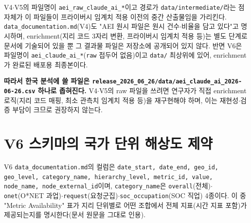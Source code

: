 \documentclass[11pt]{article}
\begin{document}
V4$\cdot$V5의 파일명이 \texttt{aei\_raw\_claude\_ai\_*}이고 경로가 \texttt{data/intermediate/}라는 점 자체가 이 파일들이 프라이버시 임계치 적용 이전의 중간 산출물임을 가리킨다. \texttt{data\_documentation.md}(V4)도 "AEI 원시 파일은 원시 건수$\cdot$비율을 담고 있다"고 명시하며, enrichment(지리 코드 3자리 변환, 프라이버시 임계치 적용 등)는 별도 단계로 문서에 기술되어 있을 뿐 그 결과물 파일은 저장소에 공개되어 있지 않다. 반면 V6은 파일명이 \texttt{aei\_claude\_ai\_*}(\texttt{raw} 접두어 없음)이고 \texttt{data/} 최상위에 있어, enrichment가 완료된 배포용 최종본이다.

\textbf{따라서 한국 분석에 쓸 파일은 \texttt{release\_2026\_06\_26/data/aei\_claude\_ai\_2026-06-26.csv} 하나로 좁혀진다.} V4$\cdot$V5의 raw 파일을 쓰려면 연구자가 직접 enrichment 로직(지리 코드 매핑, 최소 관측치 임계치 적용 등)을 재구현해야 하며, 이는 재현성$\cdot$검증 부담이 크므로 권장하지 않는다.

\section{V6 스키마의 국가 단위 해상도 제약}
\label{sec:schema}

V6 \texttt{data\_documentation.md}의 컬럼은 \texttt{date\_start, date\_end, geo\_id, geo\_level, category\_name, hierarchy\_level, metric\_id, value, node\_name, node\_external\_id}이며, \texttt{category\_name}은 \texttt{overall}(전체)$\cdot$\texttt{onet}(O*NET 과업)$\cdot$\texttt{request}(요청군집)$\cdot$\texttt{soc\_occupation}(SOC 직업) 4종이다. 이 중 "Metric Availability" 표가 지리 단위별로 어떤 조합에서 전체 지표(시간 지표 포함)가 제공되는지를 명시한다(문서 원문을 그대로 인용).
\end{document}
